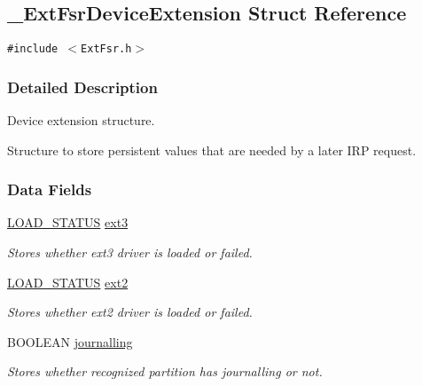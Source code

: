\hypertarget{struct__ExtFsrDeviceExtension}{
\subsection{\_\-Ext\-Fsr\-Device\-Extension Struct Reference}
\label{struct__ExtFsrDeviceExtension}
}
{\tt \#include $<$Ext\-Fsr.h$>$}



\subsubsection{Detailed Description}
Device extension structure.

Structure to store persistent values that are needed by a later IRP request. 

\subsubsection*{Data Fields}
\begin{CompactItemize}
\item 
\hypertarget{struct__ExtFsrDeviceExtension_m0}{
\hyperlink{struct__LOAD__STATUS}{LOAD\_\-STATUS} \hyperlink{struct__ExtFsrDeviceExtension_m0}{ext3}}
\label{struct__ExtFsrDeviceExtension_m0}

\begin{CompactList}\small\item\em Stores whether ext3 driver is loaded or failed.\item\end{CompactList}\item 
\hypertarget{struct__ExtFsrDeviceExtension_m1}{
\hyperlink{struct__LOAD__STATUS}{LOAD\_\-STATUS} \hyperlink{struct__ExtFsrDeviceExtension_m1}{ext2}}
\label{struct__ExtFsrDeviceExtension_m1}

\begin{CompactList}\small\item\em Stores whether ext2 driver is loaded or failed.\item\end{CompactList}\item 
\hypertarget{struct__ExtFsrDeviceExtension_m2}{
BOOLEAN \hyperlink{struct__ExtFsrDeviceExtension_m2}{journalling}}
\label{struct__ExtFsrDeviceExtension_m2}

\begin{CompactList}\small\item\em Stores whether recognized partition has journalling or not.\item\end{CompactList}\end{CompactItemize}
